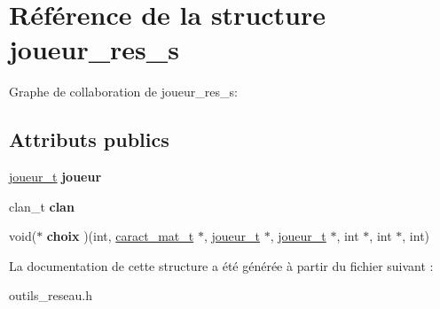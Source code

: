 \hypertarget{structjoueur__res__s}{}\section{Référence de la structure joueur\+\_\+res\+\_\+s}
\label{structjoueur__res__s}


Graphe de collaboration de joueur\+\_\+res\+\_\+s\+:
\subsection*{Attributs publics}
\begin{DoxyCompactItemize}
\item 
\hyperlink{structjoueur__s}{joueur\+\_\+t} {\bfseries joueur}\hypertarget{structjoueur__res__s_a520ec40ceaa60a5fe97ce666dbf5d12f}{}\label{structjoueur__res__s_a520ec40ceaa60a5fe97ce666dbf5d12f}

\item 
clan\+\_\+t {\bfseries clan}\hypertarget{structjoueur__res__s_aebdf880186d29b4526684717af4d80d7}{}\label{structjoueur__res__s_aebdf880186d29b4526684717af4d80d7}

\item 
void($\ast$ {\bfseries choix} )(int, \hyperlink{structcaract__mat__t}{caract\+\_\+mat\+\_\+t} $\ast$, \hyperlink{structjoueur__s}{joueur\+\_\+t} $\ast$, \hyperlink{structjoueur__s}{joueur\+\_\+t} $\ast$, int $\ast$, int $\ast$, int)\hypertarget{structjoueur__res__s_a661c177b115a4bcf235de78586cfbdbe}{}\label{structjoueur__res__s_a661c177b115a4bcf235de78586cfbdbe}

\end{DoxyCompactItemize}


La documentation de cette structure a été générée à partir du fichier suivant \+:\begin{DoxyCompactItemize}
\item 
outils\+\_\+reseau.\+h\end{DoxyCompactItemize}

